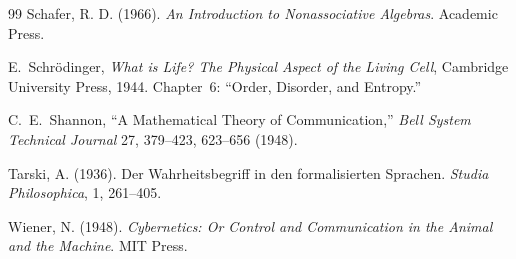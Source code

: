 \begin{thebibliography}{99}
Schafer, R. D. (1966). \emph{An Introduction to Nonassociative Algebras}. Academic Press.

E.~Schr\"odinger,
\emph{What is Life? The Physical Aspect of the Living Cell},
Cambridge University Press, 1944.
Chapter~6: ``Order, Disorder, and Entropy.''

C.~E.~Shannon,
``A Mathematical Theory of Communication,''
\emph{Bell System Technical Journal} 27, 379--423, 623--656 (1948).

Tarski, A. (1936). Der Wahrheitsbegriff in den formalisierten Sprachen. \emph{Studia Philosophica}, 1, 261--405.

Wiener, N. (1948). \emph{Cybernetics: Or Control and Communication in the Animal and the Machine}. MIT Press.

\end{thebibliography}
